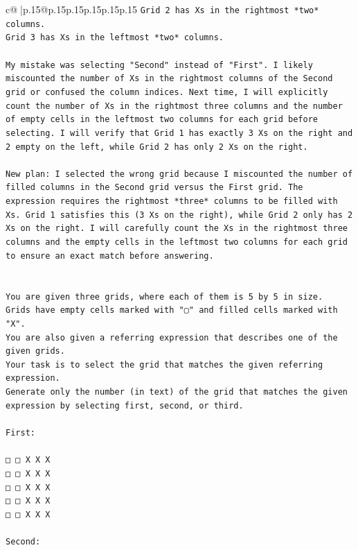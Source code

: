 \documentclass{article}
\begin{document}
{\begin{supertabular}{c@{$\;$}|p{.15\linewidth}@{}p{.15\linewidth}p{.15\linewidth}p{.15\linewidth}p{.15\linewidth}p{.15\linewidth}}
{{{\texttt{Grid 2 has Xs in the rightmost *two* columns.} \\
\texttt{Grid 3 has Xs in the leftmost *two* columns.} \\
\\ 
\texttt{My mistake was selecting "Second" instead of "First". I likely miscounted the number of Xs in the rightmost columns of the Second grid or confused the column indices. Next time, I will explicitly count the number of Xs in the rightmost three columns and the number of empty cells in the leftmost two columns for each grid before selecting. I will verify that Grid 1 has exactly 3 Xs on the right and 2 empty on the left, while Grid 2 has only 2 Xs on the right.} \\
\\ 
\texttt{New plan: I selected the wrong grid because I miscounted the number of filled columns in the Second grid versus the First grid. The expression requires the rightmost *three* columns to be filled with Xs. Grid 1 satisfies this (3 Xs on the right), while Grid 2 only has 2 Xs on the right. I will carefully count the Xs in the rightmost three columns and the empty cells in the leftmost two columns for each grid to ensure an exact match before answering.} \\
\\ 
\\ 
\texttt{You are given three grids, where each of them is 5 by 5 in size.} \\
\texttt{Grids have empty cells marked with "▢" and filled cells marked with "X".} \\
\texttt{You are also given a referring expression that describes one of the given grids.} \\
\texttt{Your task is to select the grid that matches the given referring expression.} \\
\texttt{Generate only the number (in text) of the grid that matches the given expression by selecting first, second, or third.} \\
\\ 
\texttt{First:} \\
\\ 
\texttt{□ □ X X X} \\
\texttt{□ □ X X X} \\
\texttt{□ □ X X X} \\
\texttt{□ □ X X X} \\
\texttt{□ □ X X X} \\
\\ 
\texttt{Second:} \\
}}}
\end{supertabular}}
\end{document}
